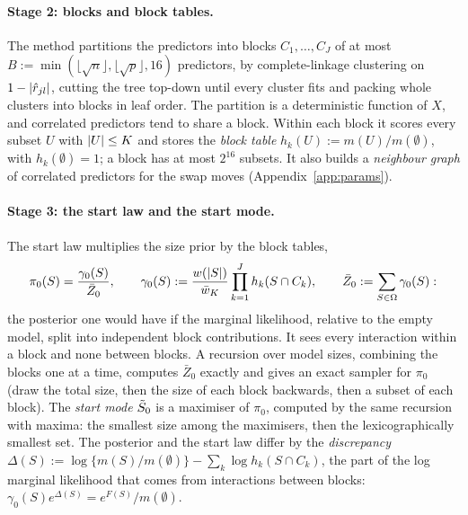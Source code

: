 \paragraph{Stage 2: blocks and block tables.} The method partitions the predictors into blocks $C_1,\dots,C_J$ of at most
$B:=\min(\lfloor\sqrt n\rfloor,\lfloor\sqrt p\rfloor,16)$ predictors, by complete-linkage clustering on $1-\lvert \hat r_{jl}\rvert$,
cutting the tree top-down until every cluster fits and packing whole clusters into blocks in leaf order. The partition is a
deterministic function of $X$, and correlated predictors tend to share a block. Within each block it scores every subset
$U$ with $\lvert U\rvert\le K$ and stores the \emph{block table} $h_k(U):=m(U)/m(\emptyset)$, with $h_k(\emptyset)=1$; a block has
at most $2^{16}$ subsets. It also builds a \emph{neighbour graph} of correlated predictors for the swap moves
(Appendix~\ref{app:params}).

\paragraph{Stage 3: the start law and the start mode.} The start law multiplies the size prior by the block tables,
\begin{equation}\label{eq:startlaw}
  \pi_0(S)=\frac{\gamma_0(S)}{\bar Z_0},\qquad \gamma_0(S):=\frac{w(\lvert S\rvert)}{\bar w_K}\prod_{k=1}^J h_k(S\cap C_k),\qquad
  \bar Z_0:=\sum_{S\in\Omega}\gamma_0(S):
\end{equation}
the posterior one would have if the marginal likelihood, relative to the empty model, split into independent block
contributions. It sees every interaction within a block and none between blocks. A recursion over model sizes, combining
the blocks one at a time, computes $\bar Z_0$ exactly and gives an exact sampler for $\pi_0$ (draw the total size, then
the size of each block backwards, then a subset of each block). The \emph{start mode} $\tilde S_0$ is a maximiser of $\pi_0$,
computed by the same recursion with maxima: the smallest size among the maximisers, then the lexicographically smallest
set. The posterior and the start law differ by the \emph{discrepancy}
$\Delta(S):=\log\{m(S)/m(\emptyset)\}-\sum_k\log h_k(S\cap C_k)$, the part of the log marginal likelihood that comes from
interactions between blocks: $\gamma_0(S)e^{\Delta(S)}=e^{F(S)}/m(\emptyset)$.

